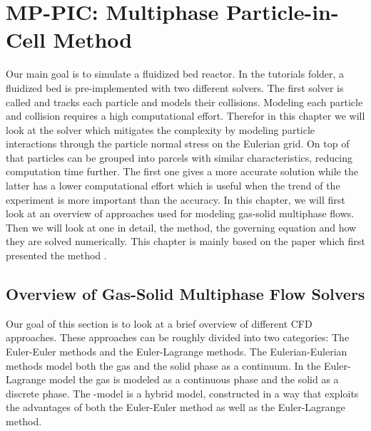 \pagebreak
\color{gray}
\chapter{MP-PIC: Multiphase Particle-in-Cell Method}
Our main goal is to simulate a fluidized bed reactor. In the \OF tutorials folder, a fluidized bed is pre-implemented with two different solvers. 
The first solver is called \DP and tracks each particle and models their collisions. 
Modeling each particle and collision requires a high computational effort.
Therefor in this chapter we will look at the \MP solver which mitigates the complexity by modeling particle interactions through the particle normal stress on the Eulerian grid.
On top of that particles can be grouped into parcels with similar characteristics, reducing computation time further. 
The first one gives a more accurate solution while the latter has a lower computational effort which is useful when the trend of the experiment is more important than the accuracy.
In this chapter, we will first look at an overview of approaches used for modeling gas-solid multiphase flows. Then we will look at one in detail, the \MP method, the governing equation and how they are solved numerically. 
This chapter is mainly based on the paper which first presented the \MP method \cite{MPPICFirst}.

\color{gray}
\section{Overview of Gas-Solid Multiphase Flow Solvers}
Our goal of this section is to look at a brief overview of different CFD approaches. 
These approaches can be roughly divided into two categories: The Euler-Euler methods and the Euler-Lagrange methods. 
The Eulerian-Eulerian methods model both the gas and the solid phase as a continuum. In the Euler-Lagrange model the gas is modeled as a continuous phase and the solid as a discrete phase.
The \MP-model is a hybrid model, constructed in a way that exploits the advantages of both the Euler-Euler method as well as the Euler-Lagrange method.



